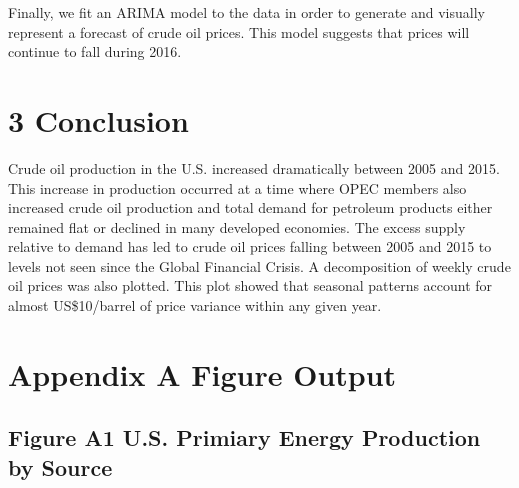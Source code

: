 \documentclass[]{article}
\begin{document}
Finally, we fit an ARIMA model to the data in order to generate and
visually represent a forecast of crude oil prices. This model suggests
that prices will continue to fall during 2016.

\section{3 Conclusion}\label{conclusion}

Crude oil production in the U.S. increased dramatically between 2005 and
2015. This increase in production occurred at a time where OPEC members
also increased crude oil production and total demand for petroleum
products either remained flat or declined in many developed economies.
The excess supply relative to demand has led to crude oil prices falling
between 2005 and 2015 to levels not seen since the Global Financial
Crisis. A decomposition of weekly crude oil prices was also plotted.
This plot showed that seasonal patterns account for almost US\$10/barrel
of price variance within any given year.

\section{Appendix A Figure Output}\label{appendix-a-figure-output}

\subsection{Figure A1 U.S. Primiary Energy Production by
Source}\label{figure-a1-u.s.-primiary-energy-production-by-source}
\end{document}
